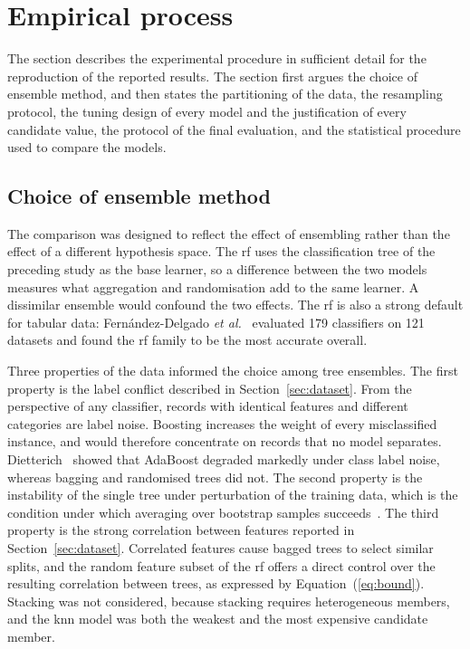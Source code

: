 \section{Empirical process}
\label{sec:empirical}

The section describes the experimental procedure in sufficient detail for the
reproduction of the reported results. The section first argues the choice
of ensemble method, and then states the partitioning of the data, the resampling protocol, the tuning design of every model and
the justification of every candidate value, the protocol of the final
evaluation, and the statistical procedure used to compare the models.

\subsection{Choice of ensemble method}
\label{sec:choice}

The comparison was designed to reflect the effect of ensembling rather than
the effect of a different hypothesis space. The \gls{rf} uses the
classification tree of the preceding study as the base learner, so a
difference between the two models measures what aggregation and
randomisation add to the same learner. A dissimilar ensemble would confound
the two effects. The \gls{rf} is also a strong default for tabular data:
Fern\'{a}ndez-Delgado \textit{et al.}~\cite{fernandez2014} evaluated 179
classifiers on 121 datasets and found the \gls{rf} family to be the most
accurate overall.

Three properties of the data informed the choice among tree ensembles. The
first property is the label conflict described in
Section~\ref{sec:dataset}. From the perspective of any classifier, records
with identical features and different categories are label noise. Boosting
increases the weight of every misclassified instance, and would therefore
concentrate on records that no model separates.
Dietterich~\cite{dietterich2000b} showed that AdaBoost degraded markedly
under class label noise, whereas bagging and randomised trees did not. The
second property is the instability of the single tree under perturbation of
the training data, which is the condition under which averaging over
bootstrap samples succeeds~\cite{breiman1996}. The third property is the
strong correlation between features reported in Section~\ref{sec:dataset}.
Correlated features cause bagged trees to select similar splits, and the
random feature subset of the \gls{rf} offers a direct control over the
resulting correlation between trees, as expressed by
Equation~(\ref{eq:bound}). Stacking was not considered, because stacking
requires heterogeneous members, and the \gls{knn} model was both the weakest
and the most expensive candidate member.

